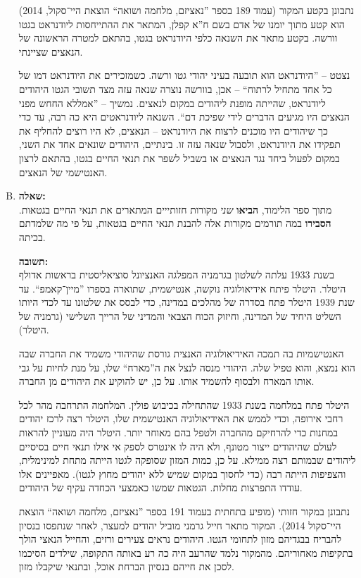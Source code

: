 \documentclass[a4paper]{article}
\begin{document}
\begin{enumerate}[A.]
			נתבונן בקטע המקור (עמוד 189 בספר ''נאציזם, מלחמה ושואה`` הוצאת היי־סקול, 2014) הוא קטע מתוך יומנו של אדם בשם ח''א קפלן, המתאר את ההתייחסות ליודנראט בגטו וורשה. בקטע מתאר את השנאה כלפי היודנראט בגטו, בהתאם למטרה הראשונה של הנאצים שציינתי. 
			
			נצטט – ''היודנראט הוא תובעה בעיני יהודי גטו ורשה. כשמזכירים את היודנראט דמו של כל אחד מתחיל לרתוח`` – אכן, בוורשה נוצרה שנאה עזה מצד תשובי הגטו היהודים ליודנראט, שהייתה מופנת ליהודים במקום לנאצים. נמשיך – ''אמללא החחש מפני הנאצים היו מגיעים הדברים לידי שפיכת דם``. השנאה ליודנראטים היא כה רבה, עד כדי כך שיהודים היו מוכנים לרצוח את היודנראט – הנאצים, לא היו רוצים להחליף את תפקידו את היודנראט, ולסבול שנאה עזה זו. בינתיים, היהודים שונאים אחד את השני, במקום לפעול ביחד נגד הנאצים או בשביל לשפר את תנאי החיים בגטו, בהתאם לרצון האנטישמי של הנאצים. 
			\item \textbf{שאלה: }\\
			מתוך ספר הלימוד, \textbf{הביאו} \textit{שני} מקורות חזותייים המתארים את תנאי החיים בגטאות. \textbf{הסבירו} במה תורמים מקורות אלה להבנת תנאי החיים בגטאות, על פי מה שלמדתם בכיתה. 
			
			\textbf{תשובה: }\\
			בשנת 1933 עלתה לשלטון בגרמניה המפלגה האנציונל סוציאליסטית בראשות אדולף היטלר. היטלר פיתח אידיאולוגיה נוקשה, אנטישמית, שתוארה בספרו ''מיין־קאמפ``. עד שנת 1939 היטלר פתח בסדרה של מהלכים במדינה, כדי לבסס את שלטונו עד לכדי היותו השליט היחיד של המדינה, וחיזוק הכוח הצבאי והמדיני של הרייך השלישי (גרמניה של היטלר). 
			
			האנטישמיות בה תמכה האידיאולוגיה האנצית גורסת שהיהודי משמיד את החברה שבה הוא נמצא, והוא טפיל שלה. היהודי מנסה לנצל את ה''מארח`` שלו, על מנת לחיות על גבי אותו המארח ולבסוף להשמיד אותו. על כן, יש להוקיע את היהודים מן החברה. 
			
			היטלר פתח במלחמה בשנת 1933 שהתחילה בכיבוש פולין. המלחמה התרחבה מהר לכל רחבי אירופה, וכדי לממש את האידיאולוגיה האנטישמית שלו, היטלר רצה לרכז יהודים במחנות כדי להרחיקם מהחברה ולטפל בהם מאוחר יותר. היטלר היה מעוניין להראות לעולם שהיהודים ייצור מטונף, ולא היה לו אינטרס לספק אי אילו תנאי חיים בסיסיים ליהודים שבמותם רצה ממילא. על כן, כמות המזון שסופקה לגטו הייתה מתחת למינימלית, והצפיפות הייתה רבה (כדי לחסוך במקום שמיש ללא יהודים מחוץ לגטו). מאפיינים אלו עודדו התפרצות מחלות. הגטאות שמשו כאמצעי הכחדה עקיף של היהודים. 
			
			נתבונן במקור חזותי (מופיע בתחתית בעמוד 191 בספר ''נאציזם, מלחמה ושואה`` הוצאת היי־סקול 2014). המקור מתאר חייל גרמני מוביל יהודים למעצר, לאחר שנתפסו בנסיון להבריח בבגדיהם מזון לתחומי הגטו. היהודים נראים צעירים ורזים, והחייל הנאצי הולך בתקיפות מאחוריהם. מהמקור נלמד שהרעב היה כה רע באותה התקופה, שילדים הסיכמו לסכן את חייהם בנסיון הברחת אוכל, ובתנאי שיקבלו מזון. 
			

\end{enumerate}
\end{document}
